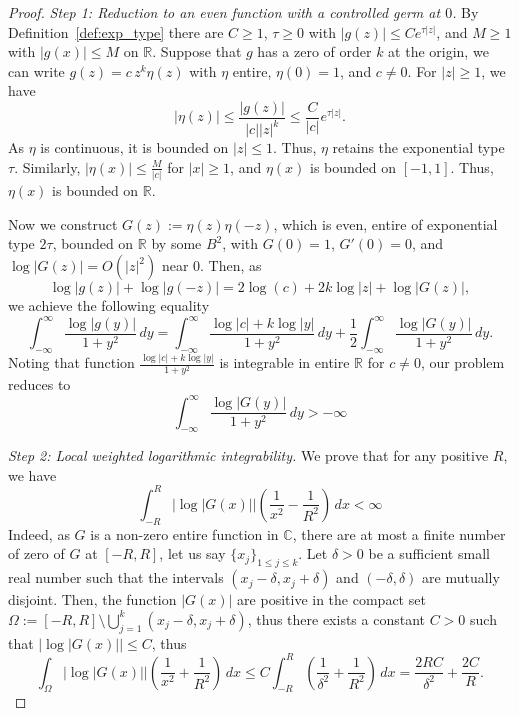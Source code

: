 \documentclass[11pt,twoside]{article} %
\begin{document}
\begin{proof}
\emph{Step 1: Reduction to an even function with a controlled germ at $0$.}
By Definition~\ref{def:exp_type} there are $C\ge1$, $\tau\ge0$ with $|g(z)|\le Ce^{\tau|z|}$, and $M\ge1$ with
$|g(x)|\le M$ on $\mathbb R$. Suppose that $g$ has a zero of order $k$ at the origin, we can write $g(z)=c\,z^k\eta(z)$ with
$\eta$ entire, $\eta(0)=1$, and $c \neq 0$. For $|z| \geq 1$, we have 
\begin{equation*}
    |\eta(z)| \leq \frac{|g(z)|}{|c||z|^k} \leq \frac{C}{|c|}e^{\tau|z|}.  
\end{equation*}
As $\eta$ is continuous, it is bounded on $|z|\leq 1$. Thus, $\eta$ retains the exponential type $\tau$. Similarly, $|\eta(x)| \le \frac{M}{|c|}$ for $|x| \ge 1$, and $\eta(x)$ is bounded on $[-1, 1]$. Thus, $\eta(x)$ is bounded on $\mathbb{R}$.

Now we construct $G(z):=\eta(z)\eta(-z)$, which is even, entire of exponential type $2\tau$, bounded on $\mathbb R$ by
some $B^2$, with $G(0)=1$, $G'(0)=0$, and $\log|G(z)|=O(|z|^2)$ near $0$. 
Then, as 
\begin{equation*}
    \log|g(z)| + \log|g(-z)| = 2\log(c) + 2k\log|z| + \log|G(z)|,
\end{equation*}
we achieve the following equality 
\begin{equation*}
    \int_{-\infty}^{\infty} \frac{\log|g(y)|}{1+y^2}\,dy = \int_{-\infty}^{\infty} \frac{\log|c| + k\log|y|}{1+y^2}\,dy + \frac{1}{2}\int_{-\infty}^{\infty}\frac{\log|G(y)|}{1+y^2}\,dy. 
\end{equation*}
Noting that function $\frac{\log |c| + k\log|y|}{1+y^2}$ is integrable in entire $\mathbb{R}$ for $c \neq 0$, our problem reduces to 
\begin{equation}
    \label{eqn:dung_levinson_theorem_reduced_form}
    \int_{-\infty}^{\infty}\frac{\log|G(y)|}{1+y^2}\,dy > -\infty
\end{equation}

\emph{Step 2: Local weighted logarithmic integrability.} We prove that for any positive $R$, we have 
\begin{equation}
\label{eqn:dung_lemma_1_near_zero_integrability}
    \int_{-R}^R |\log|G(x)||\left(\frac{1}{x^2}-\frac{1}{R^2}\right)\,dx < \infty
\end{equation}
Indeed, as $G$ is a non-zero entire function in $\mathbb{C}$, there are at most a finite number of zero of $G$ at $[-R,R]$, let us say $\{x_j\}_{1\leq j\leq k}$. Let $\delta > 0$ be a sufficient small real number such that the intervals $(x_j-\delta, x_j+\delta)$ and $(-\delta,\delta)$ are mutually disjoint. Then, the function $|G(x)|$ are positive in the compact set $\Omega := [-R,R] \setminus \bigcup_{j=1}^{k}(x_j-\delta, x_j+\delta)$, thus there exists a constant $C > 0$ such that $|\log|G(x)|| \leq C$, thus 
\begin{equation}
\label{eqn:dung_lemma_1_non_singularity_integral}
    \int_{\Omega} |\log|G(x)||\left(\frac{1}{x^2} +\frac{1}{R^2}\right)\,dx \leq C\int_{-R}^R\left(\frac{1}{\delta^2}+\frac{1}{R^2}\right)\,dx = \frac{2RC}{\delta^2} + \frac{2C}{R}. 
\end{equation}


\end{proof}
\end{document}
